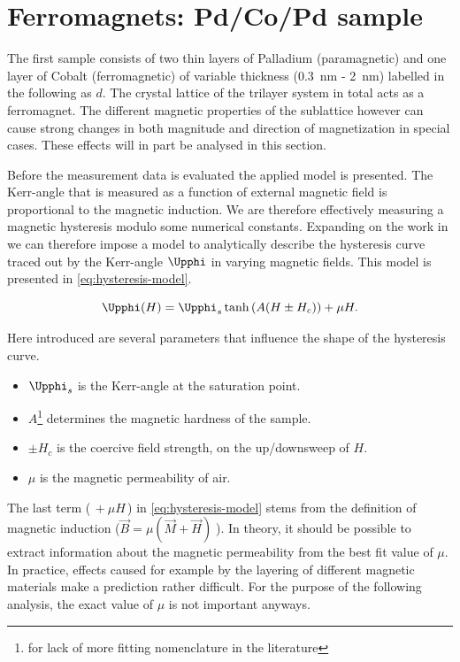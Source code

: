 
\section{Ferromagnets: Pd/Co/Pd sample}
\label{sec:ferromagnet}

The first sample consists of two thin layers of Palladium (paramagnetic) and one
layer of Cobalt (ferromagnetic) of variable thickness (\SI{0.3}{\nano\meter} - 
\SI{2}{\nano\meter}) labelled in the following as $d$. The crystal lattice of the 
trilayer system in total acts as a ferromagnet. The different magnetic properties of 
the sublattice however can cause strong changes in both magnitude and direction of 
magnetization in special cases. These effects will in part be analysed in this 
section.

Before the measurement data is evaluated the applied model is presented. The 
Kerr-angle that is measured as a function of external magnetic field is proportional
to the magnetic induction. We are therefore effectively measuring a magnetic 
hysteresis modulo some numerical constants. Expanding on the work in \cite{article}
we can therefore impose a model to analytically describe the hysteresis curve traced 
out by the Kerr-angle $\Upphi$ in varying magnetic fields. This model is presented in
\autoref{eq:hysteresis-model}.

\begin{equation}
\label{eq:hysteresis-model}
\Upphi(H) = \Upphi_s \tanh\left( A ( H \pm H_c ) \right) + \mu H.
\end{equation}

Here introduced are  several parameters that influence the shape of the hysteresis 
curve. 

\begin{itemize}
\item $\Upphi_s$ is the Kerr-angle at the saturation point. 
\item $A$\footnote{for lack of more fitting nomenclature in the literature} 
determines the magnetic hardness of the sample.
\item $\pm H_c$ is the coercive field strength, on the up/downsweep of $H$.
\item $\mu$ is the magnetic permeability of air.
\end{itemize}

The last term ($\,+\mu H\,$) in \autoref{eq:hysteresis-model} stems from the 
definition of magnetic induction ($\vec{B}=\mu(\vec{M}+\vec{H})\;$). In theory, it 
should be possible to extract information about the magnetic permeability from the
best fit value of $\mu$. In practice, effects caused for example by the layering of 
different magnetic materials make a prediction rather difficult. For the purpose of 
the following analysis, the exact value of $\mu$ is not important anyways.

